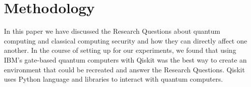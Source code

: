\documentclass[sigconf]{acmart}
\begin{document}
\section{Methodology}
In this paper we have discussed the Research Questions about quantum computing and classical computing security and how they can directly affect one another. In the course of setting up for our experiments, we found that using IBM’s gate-based quantum computers with Qiskit was the best way to create an environment that could be recreated and answer the Research Questions. Qiskit uses Python language and libraries to interact with quantum computers.
\end{document}
